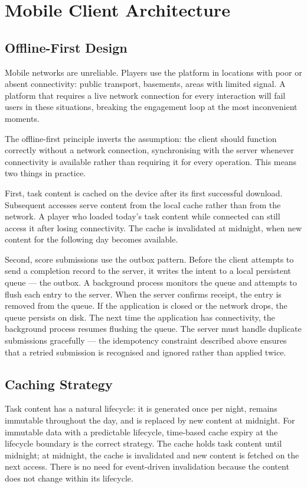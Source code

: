 \section{Mobile Client Architecture}

\subsection{Offline-First Design}

Mobile networks are unreliable. Players use the platform in locations with poor or absent connectivity: public transport, basements, areas with limited signal. A platform that requires a live network connection for every interaction will fail users in these situations, breaking the engagement loop at the most inconvenient moments.

The offline-first principle inverts the assumption: the client should function correctly without a network connection, synchronising with the server whenever connectivity is available rather than requiring it for every operation. This means two things in practice.

First, task content is cached on the device after its first successful download. Subsequent accesses serve content from the local cache rather than from the network. A player who loaded today's task content while connected can still access it after losing connectivity. The cache is invalidated at midnight, when new content for the following day becomes available.

Second, score submissions use the outbox pattern. Before the client attempts to send a completion record to the server, it writes the intent to a local persistent queue --- the outbox. A background process monitors the queue and attempts to flush each entry to the server. When the server confirms receipt, the entry is removed from the queue. If the application is closed or the network drops, the queue persists on disk. The next time the application has connectivity, the background process resumes flushing the queue. The server must handle duplicate submissions gracefully --- the idempotency constraint described above ensures that a retried submission is recognised and ignored rather than applied twice.

\subsection{Caching Strategy}

Task content has a natural lifecycle: it is generated once per night, remains immutable throughout the day, and is replaced by new content at midnight. For immutable data with a predictable lifecycle, time-based cache expiry at the lifecycle boundary is the correct strategy. The cache holds task content until midnight; at midnight, the cache is invalidated and new content is fetched on the next access. There is no need for event-driven invalidation because the content does not change within its lifecycle.

